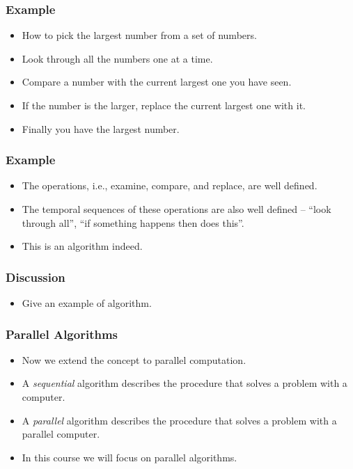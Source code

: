 \documentclass{beamer}
\begin{document}
\begin{CJK}{UTF8}{bsmi}
\begin{frame}
\frametitle{Example}
\begin{itemize}
\item How to pick the largest number from a set of numbers.
\item Look through all the numbers one at a time.
\item Compare a number with the current largest one you have seen.
\item If the number is the larger, replace the current largest one
  with it.
\item Finally you have the largest number.
\end{itemize}
\end{frame}

\begin{frame}
\frametitle{Example}
\begin{itemize}
\item The operations, i.e., examine, compare, and replace, are well
  defined.
\item The temporal sequences of these operations are also well defined
  -- ``look through all'', ``if something happens then does this''.
\item This is an algorithm indeed.
\end{itemize}
\end{frame}

\begin{frame}
\frametitle{Discussion}
\begin{itemize}
\item Give an example of algorithm.
\end{itemize}
\end{frame}

\begin{frame}
\frametitle{Parallel Algorithms}
\begin{itemize}
\item Now we extend the concept to parallel computation.
\item A {\em sequential} algorithm describes the procedure that solves
  a problem with a computer.
\item A {\em parallel} algorithm describes the procedure that solves a
  problem with a parallel computer.
\item In this course we will focus on parallel algorithms.
\end{itemize}
\end{frame}


\end{CJK}
\end{document}
